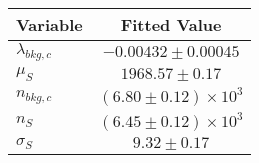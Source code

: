 \begin{tabular}[t]{lc}
\hline
Variable &Fitted Value\\
\hline\hline
$\lambda_{bkg,c}$&$-0.00432\pm0.00045$\\
\hline
$\mu_{S}$&$1968.57\pm0.17$\\
\hline
$n_{bkg,c}$&$(6.80\pm0.12)\times 10^3$\\
\hline
$n_{S}$&$(6.45\pm0.12)\times 10^3$\\
\hline
$\sigma_{S}$&$9.32\pm0.17$\\
\hline
\end{tabular}